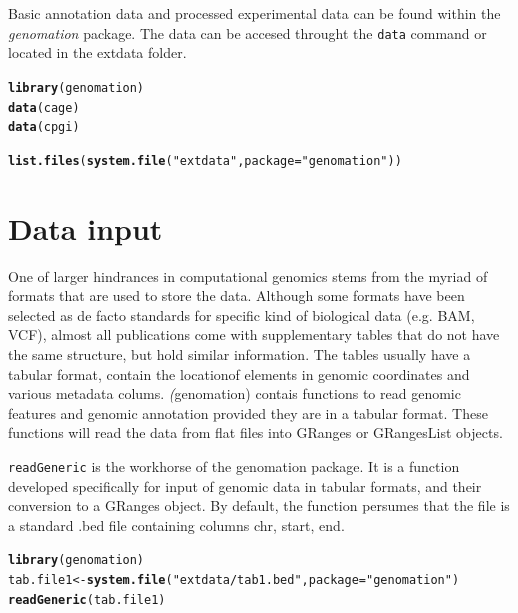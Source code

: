 \documentclass{article}\usepackage[]{graphicx}\usepackage[]{color}
\makeatletter
\newcommand{\hlstr}[1]{\textcolor[rgb]{0.192,0.494,0.8}{#1}}%
\newcommand{\hlstd}[1]{\textcolor[rgb]{0.345,0.345,0.345}{#1}}%
\newcommand{\hlkwb}[1]{\textcolor[rgb]{0.69,0.353,0.396}{#1}}%
\newcommand{\hlkwc}[1]{\textcolor[rgb]{0.333,0.667,0.333}{#1}}%
\newcommand{\hlkwd}[1]{\textcolor[rgb]{0.737,0.353,0.396}{\textbf{#1}}}%
\newenvironment{kframe}{%
 \def\at@end@of@kframe{}%
 \ifinner\ifhmode%
  \def\at@end@of@kframe{\end{minipage}}%
  \begin{minipage}{\columnwidth}%
 \fi\fi%
 \def\FrameCommand##1{\hskip\@totalleftmargin \hskip-\fboxsep
 \colorbox{shadecolor}{##1}\hskip-\fboxsep
     \hskip-\linewidth \hskip-\@totalleftmargin \hskip\columnwidth}%
 \MakeFramed {\advance\hsize-\width
   \@totalleftmargin\z@ \linewidth\hsize
   \@setminipage}}%
 {\par\unskip\endMakeFramed%
 \at@end@of@kframe}
\newenvironment{knitrout}{}{} %
\newcommand{\Rpackage}[1]{{\textit{#1}}}
\newcommand{\Rcode}[1]{{\texttt{#1}}}
\makeatother
\begin{document}
Basic annotation data and processed experimental data can be found within the 
\Rpackage{genomation} package.
The data can be accesed throught the \Rcode{data} command or located 
in the extdata folder. 
\begin{knitrout}
\color{fgcolor}\begin{kframe}
\begin{alltt}
\hlkwd{library}\hlstd{(genomation)}
\hlkwd{data}\hlstd{(cage)}
\hlkwd{data}\hlstd{(cpgi)}

\hlkwd{list.files}\hlstd{(}\hlkwd{system.file}\hlstd{(}\hlstr{"extdata"}\hlstd{,} \hlkwc{package} \hlstd{=} \hlstr{"genomation"}\hlstd{))}
\end{alltt}
\end{kframe}
\end{knitrout}




\section{Data input}

One of larger hindrances in computational genomics stems from the myriad of 
formats that are used to store the data. Although some formats have been 
selected as de facto standards for specific kind of biological data (e.g. BAM, VCF), 
almost all publications come with supplementary tables that do not have the 
same structure, but hold similar information. The tables usually have a tabular 
format, contain the locationof elements in genomic coordinates and various 
metadata colums. \Rpackage(genomation) contais functions to read genomic 
features and genomic annotation provided they are in a tabular format. 
These functions will read the data from flat files into GRanges or GRangesList 
objects.

\Rcode{readGeneric} is the workhorse of the genomation package. It is a function
developed specifically for input of genomic data in tabular formats, and their 
conversion to a GRanges object. 
By default, the function persumes that the file is a standard .bed file 
containing columns chr, start, end.
\begin{knitrout}
\color{fgcolor}\begin{kframe}
\begin{alltt}
\hlkwd{library}\hlstd{(genomation)}
\hlstd{tab.file1} \hlkwb{<-} \hlkwd{system.file}\hlstd{(}\hlstr{"extdata/tab1.bed"}\hlstd{,} \hlkwc{package} \hlstd{=} \hlstr{"genomation"}\hlstd{)}
\hlkwd{readGeneric}\hlstd{(tab.file1)}
\end{alltt}
\end{kframe}
\end{knitrout}
\end{document}
